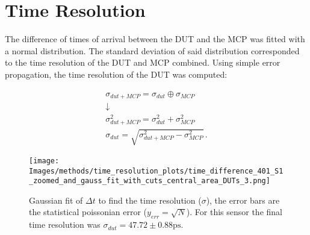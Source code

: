 \section{Time Resolution}\label{sec:methods_time_resolution}

The difference of times of arrival between the DUT and the MCP was fitted with a normal distribution. The standard deviation of said distribution corresponded to the time resolution of the DUT and MCP combined. Using simple error propagation, the time resolution of the DUT was computed: 

\begin{equation*}
    \begin{gathered}
    \sigma_{dut+MCP} = \sigma_{dut} \oplus \sigma_{MCP} \\
    \downarrow \\
    \sigma_{dut+MCP}^2 = \sigma_{dut}^2 + \sigma_{MCP}^2 \\
    \sigma_{dut} = \sqrt{\sigma_{dut+MCP}^2-\sigma_{MCP}^2}  \, .
    \end{gathered}
\end{equation*}


\begin{figure}[h!tbp]
    \centering
    \texttt{[image: Images/methods/time\_resolution\_plots/time\_difference\_401\_S1\_zoomed\_and\_gauss\_fit\_with\_cuts\_central\_area\_DUTs\_3.png]}
    \captionsetup{width=\captionwidth}
    \caption{Gaussian fit of \(\Delta t\) to find the time resolution (\(\sigma\)), the error bars are the statistical poissonian error (\(y_{err}=\sqrt{N}\)). For this sensor the final time resolution was \(\sigma_{dut} = 47.72\pm0.88\si{\ps} \).}
    \label{fig:time_resolution_plot}
\end{figure}



